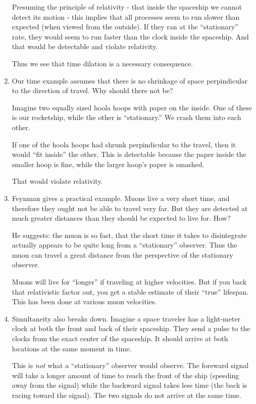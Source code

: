 \begin{enumerate}
  Presuming the principle of relativity - that inside the spaceship we
  cannot detect its motion - this implies that all processes seem to run
  slower than expected (when viewed from the outside). If they ran at
  the ``stationary'' rate, they would seem to run faster than the clock
  inside the spaceship. And that would be detectable and violate
  relativity.

  Thus we see that time dilation is a necessary consequence.

  \item Our time example assumes that there is no shrinkage of space
  perpindicular to the direction of travel. Why should there not be?

  Imagine two equally sized hoola hoops with paper on the inside. One of
  these is our rocketship, while the other is ``stationary.'' We crash
  them into each other.

  If one of the hoola hoops had shrunk perpindicular to the travel, then
  it would ``fit inside'' the other. This is detectable because the
  paper inside the smaller hoop is fine, while the larger hoop's paper
  is smashed.

  That would violate relativity.

  \item Feynman gives a practical example. Muons live a very short time,
  and therefore they ought not be able to travel very far. But they are
  detected at much greater distances than they should be expected to
  live for. How?

  He suggests: the muon is so fast, that the short time it takes to
  disintegrate actually appears to be quite long from a ``stationary''
  observer. Thus the muon can travel a great distance from the
  perspective of the stationary observer.

  Muons will live for ``longer'' if traveling at higher velocities. But
  if you back that relativistic factor out, you get a stable estimate of
  their ``true'' lifespan. This has been done at various muon
  velocities.

  \item Simultaneity also breaks down. Imagine a space traveler has a
  light-meter clock at both the front and back of their spaceship. They
  send a pulse to the clocks from the exact center of the spaceship. It
  should arrive at both locations at the same moment in time.

  This is \emph{not} what a ``stationary'' observer would observe. The
  foreward signal will take a longer amount of time to reach the front
  of the ship (speeding away from the signal) while the backward signal
  takes less time (the back is racing toward the signal). The two
  signals do not arrive at the same time.


\end{enumerate}
